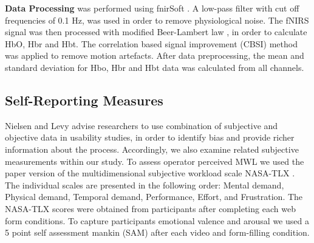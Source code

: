 \documentclass[../main/Feedback.tex]{subfiles}
\begin{document}
\textbf{Data Processing} was performed using fnirSoft \cite{ayazfunctional}. 
A low-pass filter with cut off frequencies of 0.1 Hz, was used in order to remove physiological noise. 
The fNIRS signal was then processed with modified Beer-Lambert law \cite{cope1988system}, in order to calculate HbO, Hbr and Hbt.  
The correlation based signal improvement (CBSI) \cite{cui2010functional} method was applied to remove motion artefacts.
After data preprocessing, the mean and standard deviation for Hbo, Hbr and Hbt data was calculated from all channels.


\subsection{Self-Reporting Measures}
Nielsen and Levy \cite{nielsen1994measuring} advise researchers to use combination of subjective and objective data in usability studies, in order to identify bias and provide richer information about the process. Accordingly, we also examine related subjective measurements within our study. To assess operator perceived MWL we used the paper version of the multidimensional subjective workload scale NASA-TLX \cite{nasatlx}.
The individual scales are presented in the following order: Mental demand, Physical demand, Temporal demand, Performance, Effort, and Frustration.
The NASA-TLX scores were obtained from participants after completing each web form conditions. To capture participants emotional valence and arousal we used a 5 point self assessment mankin (SAM) \cite{bradley1994measuring} after each video and form-filling condition.  
\end{document}
